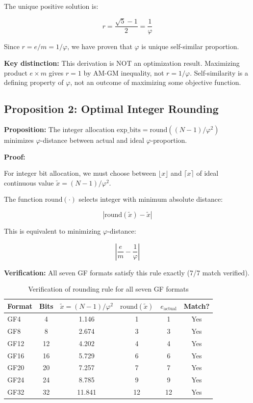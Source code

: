 \documentclass{article}
\begin{document}
The unique positive solution is:

$$r = \frac{\sqrt{5} - 1}{2} = \frac{1}{\varphi}$$

Since $r = e/m = 1/\varphi$, we have proven that $\varphi$ is unique self-similar proportion.

\textbf{Key distinction:} This derivation is NOT an optimization result. Maximizing product $e \times m$ gives $r = 1$ by AM-GM inequality, not $r = 1/\varphi$. Self-similarity is a defining property of $\varphi$, not an outcome of maximizing some objective function.

\subsection{Proposition 2: Optimal Integer Rounding}

\textbf{Proposition:} The integer allocation $\text{exp\_bits} = \text{round}((N-1)/\varphi^2)$ minimizes $\varphi$-distance between actual and ideal $\varphi$-proportion.

\textbf{Proof:}

For integer bit allocation, we must choose between $\lfloor x \rfloor$ and $\lceil x \rceil$ of ideal continuous value $\tilde{x} = (N-1)/\varphi^2$.

The function $\text{round}(\cdot)$ selects integer with minimum absolute distance:

$$|\text{round}(\tilde{x}) - \tilde{x}|$$

This is equivalent to minimizing $\varphi$-distance:

$$\left|\frac{e}{m} - \frac{1}{\varphi}\right|$$

\textbf{Verification:} All seven GF formats satisfy this rule exactly (7/7 match verified).

\begin{table}[h]
\centering
\begin{tabular}{lccccc}
\toprule
Format & Bits & $\tilde{x} = (N-1)/\varphi^2$ & $\text{round}(\tilde{x})$ & $e_{\text{actual}}$ & Match? \\
\midrule
GF4    & 4     & 1.146 & 1 & 1 & Yes \\
GF8    & 8     & 2.674 & 3 & 3 & Yes \\
GF12   & 12    & 4.202 & 4 & 4 & Yes \\
GF16   & 16    & 5.729 & 6 & 6 & Yes \\
GF20   & 20    & 7.257 & 7 & 7 & Yes \\
GF24   & 24    & 8.785 & 9 & 9 & Yes \\
GF32   & 32    & 11.841 & 12 & 12 & Yes \\
\bottomrule
\end{tabular}
\caption{Verification of rounding rule for all seven GF formats}
\end{table}
\end{document}
